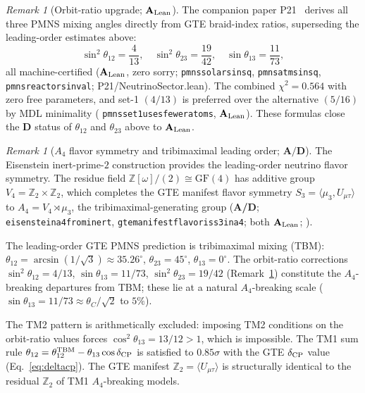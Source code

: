 \documentclass[11pt]{article}
\theoremstyle{remark}
\newtheorem{remark}[theorem]{Remark}
\newcommand{\lean}[1]{%
  \penalty-100
  \begingroup\def\_{\textunderscore\allowbreak}\texttt{#1}\endgroup}
\newcommand{\CatAL}{\ensuremath{\textbf{A}_{\rm Lean}}}
\newcommand{\CatAD}{\textbf{A/D}}
\newcommand{\CatD}{\textbf{D}}
\begin{document}
\begin{remark}[Orbit-ratio upgrade; $\CatAL$]
\label{rem:pmns_orbit_ratio}
The companion paper P21~\cite{SpivackNeutrino} derives all three PMNS mixing angles
directly from GTE braid-index ratios, superseding the leading-order estimates above:
\begin{equation}
  \sin^2\!\theta_{12} = \frac{4}{13},\quad
  \sin^2\!\theta_{23} = \frac{19}{42},\quad
  \sin\theta_{13} = \frac{11}{73},
  \label{eq:pmns_orbit_ratios}
\end{equation}
all machine-certified ($\CatAL$, zero sorry;
\lean{pmns\_solar\_sin\_sq}, \lean{pmns\_atm\_sin\_sq}, \lean{pmns\_reactor\_sin\_val};
P21/NeutrinoSector.lean). The combined $\chi^2 = 0.564$ with zero free parameters,
and set-1 $(4/13)$ is preferred over the alternative $(5/16)$ by MDL minimality
(\lean{pmns\_set1\_uses\_fewer\_atoms}, $\CatAL$).
These formulas close the $\CatD$ status of $\theta_{12}$ and $\theta_{23}$
above to $\CatAL$.
\end{remark}

\begin{remark}[$A_4$ flavor symmetry and tribimaximal leading order; $\CatAD$]
\label{rem:a4_flavor}
The Eisenstein inert-prime-$2$ construction provides the leading-order neutrino
flavor symmetry.
The residue field $\mathbb{Z}[\omega]/(2) \cong \mathrm{GF}(4)$ has additive group
$V_4 = \mathbb{Z}_2 \times \mathbb{Z}_2$, which completes the GTE manifest flavor
symmetry $S_3 = \langle \mu_3, U_{\mu\tau} \rangle$ to
$A_4 = V_4 \rtimes \mu_3$, the tribimaximal-generating group (\CatAD;
\lean{eisenstein\_a4\_from\_inert\_2}, \lean{gte\_manifest\_flavor\_is\_s3\_in\_a4};
both \CatAL; \cite{SpivackPSL27Unification}).

The leading-order GTE PMNS prediction is tribimaximal mixing (TBM):
$\theta_{12} = \arcsin(1/\!\sqrt{3}) \approx 35.26^\circ$,
$\theta_{23} = 45^\circ$, $\theta_{13} = 0^\circ$.
The orbit-ratio corrections $\sin^2\theta_{12} = 4/13$,
$\sin\theta_{13} = 11/73$, $\sin^2\theta_{23} = 19/42$
(Remark~\ref{rem:pmns_orbit_ratio}) constitute the $A_4$-breaking departures
from TBM; these lie at a natural $A_4$-breaking scale
($\sin\theta_{13} = 11/73 \approx \theta_C/\!\sqrt{2}$ to $5\%$).

The TM2 pattern is arithmetically excluded: imposing TM2 conditions on the
orbit-ratio values forces $\cos^2\theta_{13} = 13/12 > 1$, which is impossible.
The TM1 sum rule $\theta_{12} = \theta_{12}^{\rm TBM} - \theta_{13}\cos\delta_{\rm CP}$
is satisfied to $0.85\sigma$ with the GTE $\delta_{\rm CP}$ value
(Eq.~\eqref{eq:deltacp}).
The GTE manifest $\mathbb{Z}_2 = \langle U_{\mu\tau} \rangle$ is structurally
identical to the residual $\mathbb{Z}_2$ of TM1 $A_4$-breaking models.
\end{remark}
\end{document}
